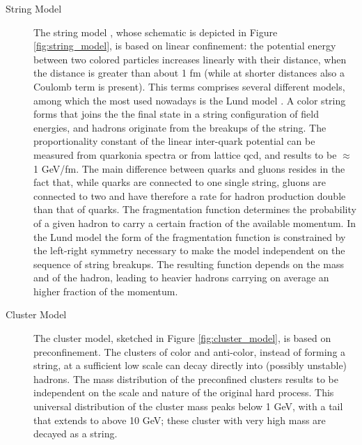 \begin{description}
\item[String Model] The string model \cite{Artru:1974hr}, whose schematic is depicted in Figure \ref{fig:string_model}, is based on linear confinement: the potential energy between two colored particles increases linearly with their distance, when the distance is greater than about 1 fm (while at shorter distances also a Coulomb term is present). This terms comprises several different models, among which the most used nowadays is the Lund model \cite{Andersson:1983ia,Andersson:1998tv}. 
A color string forms that joins the the final state in a string configuration of field energies, and hadrons originate from the breakups of the string. The proportionality constant of the linear inter-quark potential can be measured from quarkonia spectra or from lattice \gls{qcd}, and results to be $\approx$ 1 GeV/fm.
The main difference between quarks and gluons resides in the fact that, while quarks are connected to one single string, gluons are connected to two and have therefore a rate for hadron production double than that of quarks. 
The fragmentation function determines the probability of a given hadron to carry a certain fraction of the available momentum. In the Lund model the form of the fragmentation function is constrained by the left-right symmetry necessary to make the model independent on the sequence of string breakups. The resulting function depends on the mass and \pt of the hadron, leading to heavier hadrons carrying on average an higher fraction of the momentum.

\item[Cluster Model] The cluster model, sketched in Figure \ref{fig:cluster_model}, is based on preconfinement. The clusters of color and anti-color, instead of forming a string, at a sufficient low scale can decay directly into (possibly unstable) hadrons. The mass distribution of the preconfined clusters results to be independent on the scale and nature of the original hard process. This universal distribution of the cluster mass peaks below 1 GeV, with a tail that extends to above 10 GeV; these cluster with very high mass are decayed as a string.  

\end{description}

